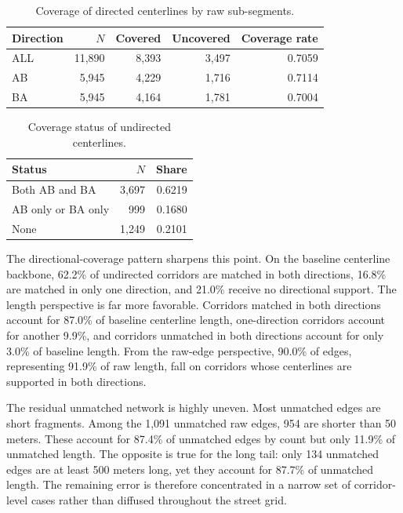 \documentclass[12pt]{article}
\begin{document}
	\begin{table}[h!]
		\centering
		\caption{Coverage of directed centerlines by raw sub-segments.}
		\label{tab:directed-coverage}
		\begin{tabular}{l r r r r}
			\toprule
			Direction & $N$ & Covered & Uncovered & Coverage rate \\
			\midrule
			ALL & 11,890 & 8,393 & 3,497 & 0.7059 \\
			AB  & 5,945 & 4,229 & 1,716 & 0.7114 \\
			BA  & 5,945 & 4,164 & 1,781 & 0.7004 \\
			\bottomrule
		\end{tabular}
	\end{table}
	
	\begin{table}[h!]
		\centering
		\caption{Coverage status of undirected centerlines.}
		\label{tab:undirected-coverage}
		\begin{tabular}{l r r}
			\toprule
			Status & $N$ & Share \\
			\midrule
			Both AB and BA & 3,697 & 0.6219 \\
			AB only or BA only & 999 & 0.1680 \\
			None & 1,249 & 0.2101 \\
			\bottomrule
		\end{tabular}
	\end{table}
	
	The directional-coverage pattern sharpens this point. On the baseline centerline backbone, 62.2\% of undirected corridors are matched in both directions, 16.8\% are matched in only one direction, and 21.0\% receive no directional support. The length perspective is far more favorable. Corridors matched in both directions account for 87.0\% of baseline centerline length, one-direction corridors account for another 9.9\%, and corridors unmatched in both directions account for only 3.0\% of baseline length. From the raw-edge perspective, 90.0\% of edges, representing 91.9\% of raw length, fall on corridors whose centerlines are supported in both directions.
	
	The residual unmatched network is highly uneven. Most unmatched edges are short fragments. Among the 1,091 unmatched raw edges, 954 are shorter than 50 meters. These account for 87.4\% of unmatched edges by count but only 11.9\% of unmatched length. The opposite is true for the long tail: only 134 unmatched edges are at least 500 meters long, yet they account for 87.7\% of unmatched length. The remaining error is therefore concentrated in a narrow set of corridor-level cases rather than diffused throughout the street grid.
	
\end{document}

